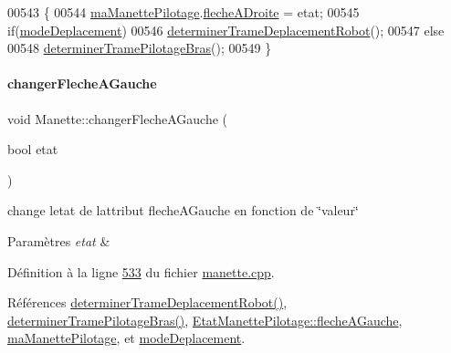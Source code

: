 \begin{DoxyCode}
00543 \{
00544     \hyperlink{class_manette_aeb3e02eaeaec4c656f78ed8fc6dae342}{maManettePilotage}.\hyperlink{struct_etat_manette_pilotage_a78a791f6f8968042efd8e2f64f70f882}{flecheADroite} = etat;
00545     \textcolor{keywordflow}{if}(\hyperlink{class_manette_a4dc6231c8cc65fac03f59d323fa9a038}{modeDeplacement})
00546         \hyperlink{class_manette_a97a50caac68954a229c7e9461e7f4232}{determinerTrameDeplacementRobot}();
00547     \textcolor{keywordflow}{else}
00548         \hyperlink{class_manette_ab5eb6972f366aa7527b2b27da5539638}{determinerTramePilotageBras}();
00549 \}
\end{DoxyCode}
\mbox{\label{class_manette_ad4a00c510c7f6beb882d1e1d323346ae}} 
\paragraph{\texorpdfstring{changer\+Fleche\+A\+Gauche}{changerFlecheAGauche}}
{\footnotesize\ttfamily void Manette\+::changer\+Fleche\+A\+Gauche (\begin{DoxyParamCaption}\item[{bool}]{etat }\end{DoxyParamCaption})\hspace{0.3cm}{\ttfamily [slot]}}



change l\textquotesingle{}etat de l\textquotesingle{}attribut fleche\+A\+Gauche en fonction de \char`\"{}valeur\char`\"{} 


\begin{DoxyParams}{Paramètres}
{\em etat} & \\
\hline
\end{DoxyParams}


Définition à la ligne \hyperlink{manette_8cpp_source_l00533}{533} du fichier \hyperlink{manette_8cpp_source}{manette.\+cpp}.



Références \hyperlink{manette_8cpp_source_l00341}{determiner\+Trame\+Deplacement\+Robot()}, \hyperlink{manette_8cpp_source_l00375}{determiner\+Trame\+Pilotage\+Bras()}, \hyperlink{manette_8h_source_l00154}{Etat\+Manette\+Pilotage\+::fleche\+A\+Gauche}, \hyperlink{manette_8h_source_l00246}{ma\+Manette\+Pilotage}, et \hyperlink{manette_8h_source_l00253}{mode\+Deplacement}.


